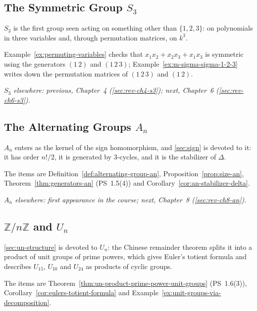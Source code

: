 \documentclass[11pt]{report}
\begin{document}
\subsection{\texorpdfstring{The Symmetric Group $S_3$}{The Symmetric Group S₃}}\label{sec:rev-ch5-s3}

$S_3$ is the first group seen acting on something other than $\{1, 2, 3\}$: on polynomials in three variables and, through permutation matrices, on $k^3$.

Example~\ref{ex:permuting-variables} checks that $x_1x_2 + x_2x_3 + x_1x_3$ is symmetric using the generators $(1\,2)$ and $(1\,2\,3)$; Example~\ref{ex:m-sigma-sigma-1-2-3} writes down the permutation matrices of $(1\,2\,3)$ and $(1\,2)$.

\textit{$S_3$ elsewhere: previous, Chapter~4 (\ref{sec:rev-ch4-s3}); next, Chapter~6 (\ref{sec:rev-ch6-s3}).}

\subsection{\texorpdfstring{The Alternating Groups $A_n$}{The Alternating Groups Aₙ}}\label{sec:rev-ch5-an}

$A_n$ enters as the kernel of the sign homomorphism, and \ref{sec:sign} is devoted to it: it has order $n!/2$, it is generated by $3$-cycles, and it is the stabilizer of $\Delta$.

The items are Definition~\ref{def:alternating-group-an}, Proposition~\ref{prop:size-an}, Theorem~\ref{thm:generators-an} (PS~1.5(4)) and Corollary~\ref{cor:an-stabilizer-delta}.

\textit{$A_n$ elsewhere: first appearance in the course; next, Chapter~8 (\ref{sec:rev-ch8-an}).}

\subsection{\texorpdfstring{$\mathbb{Z}/n\mathbb{Z}$ and $U_n$}{ℤ/nℤ and Uₙ}}\label{sec:rev-ch5-zn}

\ref{sec:un-structure} is devoted to $U_n$: the Chinese remainder theorem splits it into a product of unit groups of prime powers, which gives Euler's totient formula and describes $U_{15}$, $U_{10}$ and $U_{24}$ as products of cyclic groups.

The items are Theorem~\ref{thm:un-product-prime-power-unit-groups} (PS~1.6(3)), Corollary~\ref{cor:eulers-totient-formula} and Example~\ref{ex:unit-groups-via-decomposition}.
\end{document}
